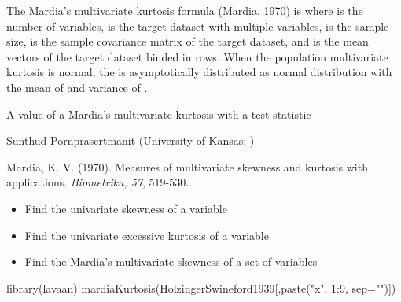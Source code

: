 \documentclass[a4paper]{book}
\begin{document}
%
\begin{Details}\relax
The Mardia's multivariate kurtosis formula (Mardia, 1970) is
where  is the number of variables,  is the target dataset with multiple variables,  is the sample size,  is the sample covariance matrix of the target dataset, and  is the mean vectors of the target dataset binded in  rows. When the population multivariate kurtosis is normal, the  is asymptotically distributed as normal distribution with the mean of  and variance of .
\end{Details}
%
\begin{Value}
A value of a Mardia's multivariate kurtosis with a test statistic 
\end{Value}
%
\begin{Author}\relax
Sunthud Pornprasertmanit (University of Kansas; )
\end{Author}
%
\begin{References}\relax
Mardia, K. V. (1970). Measures of multivariate skewness and kurtosis with applications. \emph{Biometrika, 57}, 519-530.
\end{References}
%
\begin{SeeAlso}\relax
\begin{itemize}

\item {} Find the univariate skewness of a variable
\item {} Find the univariate excessive kurtosis of a variable
\item {} Find the Mardia's multivariate skewness of a set of variables

\end{itemize}

\end{SeeAlso}
%
\begin{Examples}
\begin{ExampleCode}
library(lavaan)
mardiaKurtosis(HolzingerSwineford1939[,paste("x", 1:9, sep="")])
\end{ExampleCode}
\end{Examples}
\end{document}
